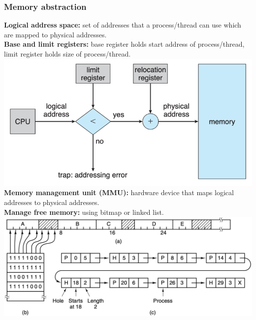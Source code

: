 \subsubsection{Memory abstraction}
\textbf{Logical address space:} set of addresses that a process/thread can use which are mapped to physical addresses.\\
\textbf{Base and limit registers:} base register holds start address of process/thread, limit register holds size of process/thread.\\
\includegraphics[width=\linewidth]{figs/base-and-limit-registers.png}
\textbf{Memory management unit (MMU):} hardware device that maps logical addresses to physical addresses.\\
\textbf{Manage free memory:} using bitmap or linked list.\\
\includegraphics[width=\linewidth]{figs/memory-management.png}

